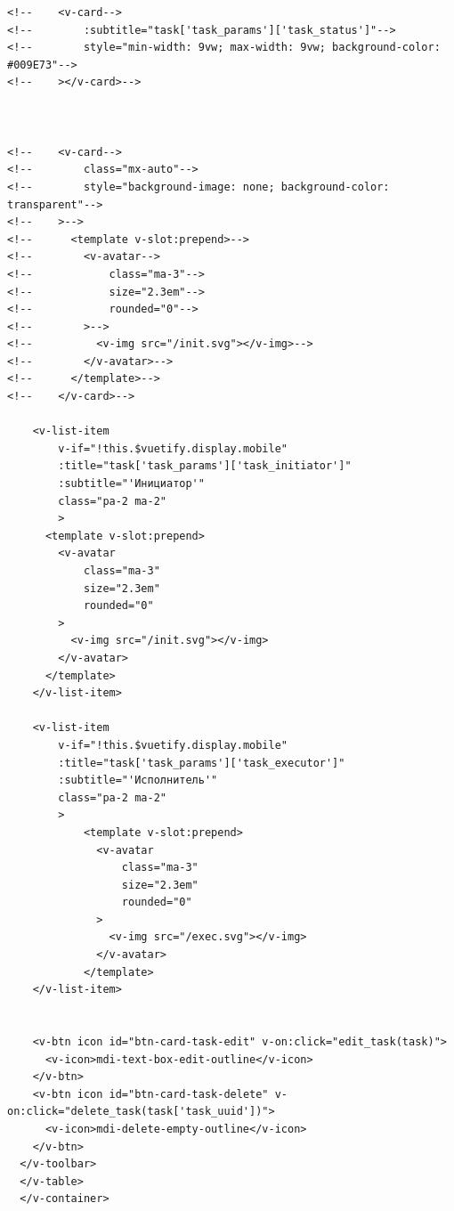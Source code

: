 \documentclass{altsu-report}
\begin{document}
\begin{code}
\begin{verbatim}
<!--    <v-card-->
<!--        :subtitle="task['task_params']['task_status']"-->
<!--        style="min-width: 9vw; max-width: 9vw; background-color: #009E73"-->
<!--    ></v-card>-->



<!--    <v-card-->
<!--        class="mx-auto"-->
<!--        style="background-image: none; background-color: transparent"-->
<!--    >-->
<!--      <template v-slot:prepend>-->
<!--        <v-avatar-->
<!--            class="ma-3"-->
<!--            size="2.3em"-->
<!--            rounded="0"-->
<!--        >-->
<!--          <v-img src="/init.svg"></v-img>-->
<!--        </v-avatar>-->
<!--      </template>-->
<!--    </v-card>-->

    <v-list-item
        v-if="!this.$vuetify.display.mobile"
        :title="task['task_params']['task_initiator']"
        :subtitle="'Инициатор'"
        class="pa-2 ma-2"
        >
      <template v-slot:prepend>
        <v-avatar
            class="ma-3"
            size="2.3em"
            rounded="0"
        >
          <v-img src="/init.svg"></v-img>
        </v-avatar>
      </template>
    </v-list-item>

    <v-list-item
        v-if="!this.$vuetify.display.mobile"
        :title="task['task_params']['task_executor']"
        :subtitle="'Исполнитель'"
        class="pa-2 ma-2"
        >
            <template v-slot:prepend>
              <v-avatar
                  class="ma-3"
                  size="2.3em"
                  rounded="0"
              >
                <v-img src="/exec.svg"></v-img>
              </v-avatar>
            </template>
    </v-list-item>


    <v-btn icon id="btn-card-task-edit" v-on:click="edit_task(task)">
      <v-icon>mdi-text-box-edit-outline</v-icon>
    </v-btn>
    <v-btn icon id="btn-card-task-delete" v-on:click="delete_task(task['task_uuid'])">
      <v-icon>mdi-delete-empty-outline</v-icon>
    </v-btn>
  </v-toolbar>
  </v-table>
  </v-container>


\end{verbatim}
\end{code}
\end{document}
